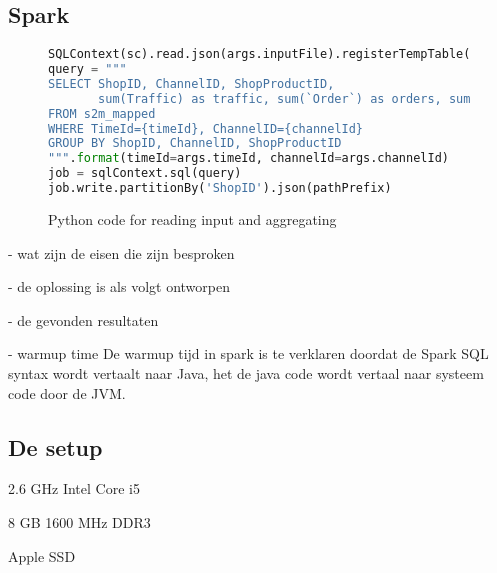 \clearpage

\subsection{Spark}

\begin{figure}[h]
\caption{Python code for reading input and aggregating }
\begin{lstlisting}[language=python]
SQLContext(sc).read.json(args.inputFile).registerTempTable("s2m_mapped")
query = """
SELECT ShopID, ChannelID, ShopProductID,
       sum(Traffic) as traffic, sum(`Order`) as orders, sum(Cost) as costs
FROM s2m_mapped
WHERE TimeId={timeId}, ChannelID={channelId}
GROUP BY ShopID, ChannelID, ShopProductID
""".format(timeId=args.timeId, channelId=args.channelId)
job = sqlContext.sql(query)
job.write.partitionBy('ShopID').json(pathPrefix)
\end{lstlisting}
\end{figure}


- wat zijn de eisen die zijn besproken

- de oplossing is als volgt ontworpen

- de gevonden resultaten

- warmup time
De warmup tijd in spark is te verklaren doordat de Spark SQL syntax wordt vertaalt naar Java, het de java code wordt vertaal naar systeem code door de JVM.


\subsection{De setup}
\label{subsec:3.4hardware_specs}


2.6 GHz Intel Core i5

8 GB 1600 MHz DDR3

Apple SSD
